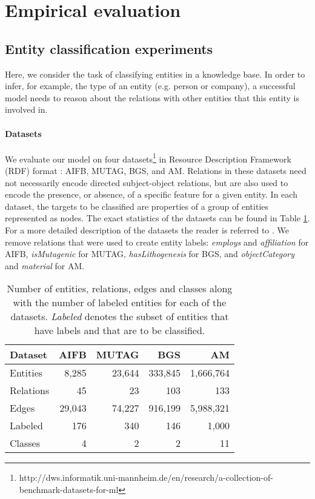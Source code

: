 \section{Empirical evaluation}

\subsection{Entity classification experiments}\label{sec:ent_exp}
Here, we consider the task of classifying entities in a knowledge base. In order to infer, for example, the type of an entity (e.g. person or company), a successful model needs to reason about the relations with other entities that this entity is involved in.

\paragraph{Datasets}
We evaluate our model on four datasets\footnote{http://dws.informatik.uni-mannheim.de/en/research/a-collection-of-benchmark-datasets-for-ml} in Resource Description Framework (RDF) format \cite{ristoski2016collection}: AIFB, MUTAG, BGS, and AM. Relations in these datasets need not necessarily encode directed subject-object relations, but are also used to encode the presence, or absence, of a specific feature for a given entity. In each dataset, the targets to be classified are properties of a group of entities represented as nodes. The exact statistics of the datasets can be found in Table \ref{table:classification_datasets}. For a more detailed description of the datasets the reader is referred to \citet{ristoski2016collection}. We remove relations that were used to create entity labels: \textit{employs} and \textit{affiliation} for AIFB, \textit{isMutagenic} for MUTAG, \textit{hasLithogenesis} for BGS, and \textit{objectCategory} and \textit{material} for AM.

\begin{table}[htp!]
\centering
\begin{tabular}{lrrrr}
\toprule
Dataset & AIFB & MUTAG & BGS & AM  \\ \midrule
Entities    & 8,285 & 23,644 & 333,845 & 1,666,764 \\
Relations   & 45 & 23 & 103 & 133 \\
Edges   & 29,043 & 74,227 & 916,199& 5,988,321 \\
Labeled  & 176 & 340 & 146 &  1,000 \\
Classes  & 4 & 2 & 2 &  11 \\

 \bottomrule
\end{tabular}
\caption{Number of entities, relations, edges and classes along with the number of labeled entities for each of the datasets. \textit{Labeled} denotes the subset of entities that have labels and that are to be classified.}
\label{table:classification_datasets}
\end{table}


